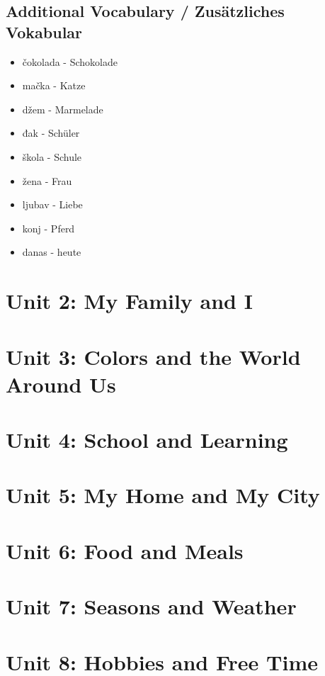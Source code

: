 \subsection*{Additional Vocabulary / Zusätzliches Vokabular}
\begin{itemize}
    \item čokolada - Schokolade
    \item mačka - Katze
    \item džem - Marmelade
    \item đak - Schüler
    \item škola - Schule
    \item žena - Frau
    \item ljubav - Liebe
    \item konj - Pferd
    \item danas - heute
\end{itemize}

\section{Unit 2: My Family and I}

\section{Unit 3: Colors and the World Around Us}

\section{Unit 4: School and Learning}

\section{Unit 5: My Home and My City}

\section{Unit 6: Food and Meals}

\section{Unit 7: Seasons and Weather}

\section{Unit 8: Hobbies and Free Time}

